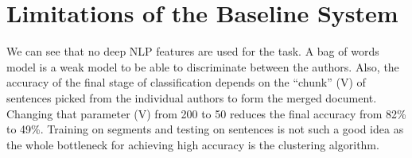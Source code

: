 \documentclass[letterpaper]{article}
\begin{document}
\begin{figure}

\end{figure}

\section{Limitations of the Baseline System}
We can see that no deep NLP features are used for the task. A bag of words model is a weak model to be able to discriminate between the authors. Also, the accuracy of the final stage of classification depends on the “chunk” (V) of sentences picked from the individual authors to form the merged document. Changing that parameter (V) from 200 to 50 reduces the final accuracy from 82\% to 49\%. Training on segments and testing on sentences is not such a good idea as the whole bottleneck for achieving high accuracy is the clustering algorithm.
\end{document}
